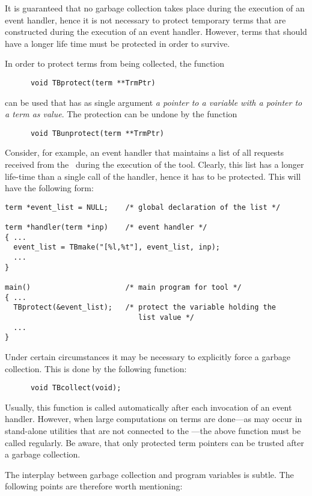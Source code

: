 It is guaranteed that no garbage collection takes place during
the execution of an event handler, hence it is not necessary to
protect temporary terms that are constructed during the execution
of an event handler.
However, terms that should have a longer life time must be protected
in order to survive.

In order to protect terms from being collected, the function
\begin{verbatim}
      void TBprotect(term **TrmPtr)
\end{verbatim}
can be used that has as single argument {\em a pointer to a variable
with a pointer to a term as value}. The protection can be undone
by the function
\begin{verbatim}
      void TBunprotect(term **TrmPtr)
\end{verbatim}

Consider, for example, an event handler that maintains a list
of all requests received from the \TB\ during the execution
of the tool. Clearly, this list has a longer life-time than
a single call of the handler, hence it has to be protected.
This will have the following form:
\begin{verbatim}
term *event_list = NULL;    /* global declaration of the list */

term *handler(term *inp)    /* event handler */
{ ...
  event_list = TBmake("[%l,%t"], event_list, inp);
  ...
}

main()                      /* main program for tool */
{ ...
  TBprotect(&event_list);   /* protect the variable holding the
                               list value */
  ...
}
\end{verbatim}

Under certain circumstances it may be necessary to explicitly force
a garbage collection. This is done by the following function:
\begin{verbatim}
      void TBcollect(void);
\end{verbatim}

Usually, this function is called automatically after each invocation
of an event handler. However, when large computations on terms are done---as
may occur in stand-alone utilities that are not connected to
the \TB---the above function must be called regularly.
Be aware, that only protected term pointers can be trusted
after a garbage collection.

The interplay between garbage collection and program variables
is subtle. The following points are therefore worth  mentioning:

